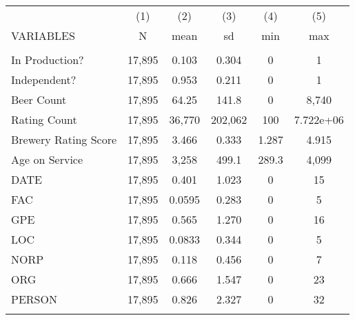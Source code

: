 \begin{tabular}{lccccc} \hline
    & (1) & (2) & (3) & (4) & (5) \\
   VARIABLES & N & mean & sd & min & max \\ \hline
    &  &  &  &  &  \\
   In Production? & 17,895 & 0.103 & 0.304 & 0 & 1 \\
   Independent? & 17,895 & 0.953 & 0.211 & 0 & 1 \\
   Beer Count & 17,895 & 64.25 & 141.8 & 0 & 8,740 \\
   Rating Count & 17,895 & 36,770 & 202,062 & 100 & 7.722e+06 \\
   Brewery Rating Score & 17,895 & 3.466 & 0.333 & 1.287 & 4.915 \\
   Age on Service & 17,895 & 3,258 & 499.1 & 289.3 & 4,099 \\
   DATE & 17,895 & 0.401 & 1.023 & 0 & 15 \\
   FAC & 17,895 & 0.0595 & 0.283 & 0 & 5 \\
   GPE & 17,895 & 0.565 & 1.270 & 0 & 16 \\
   LOC & 17,895 & 0.0833 & 0.344 & 0 & 5 \\
   NORP & 17,895 & 0.118 & 0.456 & 0 & 7 \\
   ORG & 17,895 & 0.666 & 1.547 & 0 & 23 \\
   PERSON & 17,895 & 0.826 & 2.327 & 0 & 32 \\
    &  &  &  &  &  \\ \hline
   \end{tabular}